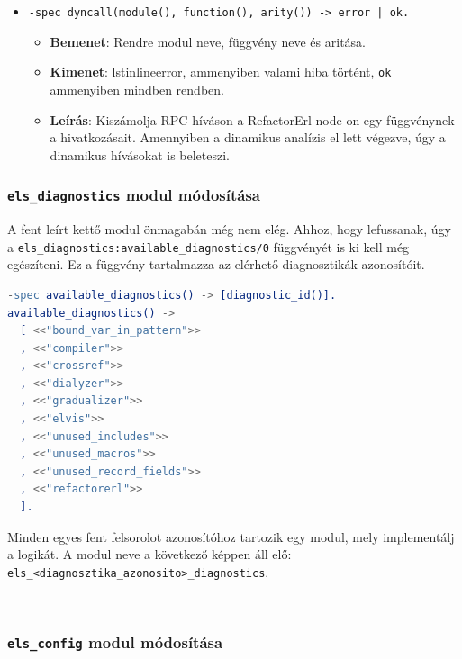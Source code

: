 \begin{itemize}
    
    
    \item \lstinline{-spec dyncall(module(), function(), arity()) -> error | ok.}
    \begin{itemize}
            \item \textbf{Bemenet}: Rendre modul neve, függvény neve és aritása.
            \item \textbf{Kimenet}:  lstinline{error}, ammenyiben valami hiba történt, \lstinline{ok} ammenyiben mindben rendben.
            \item \textbf{Leírás}: Kiszámolja RPC híváson a RefactorErl node-on egy függvénynek a hivatkozásait. Amennyiben a dinamikus analízis el lett végezve, úgy a dinamikus hívásokat is beleteszi.
        \end{itemize}

\end{itemize}




\subsubsection{\lstinline{els_diagnostics} modul módosítása}

A fent leírt kettő modul önmagabán még nem elég. Ahhoz, hogy lefussanak, úgy a \lstinline{els_diagnostics:available_diagnostics/0} függvényét is ki kell még egészíteni. Ez a függvény tartalmazza az elérhető diagnosztikák azonosítóit.

\begin{lstlisting}[language={erlang}]
-spec available_diagnostics() -> [diagnostic_id()].
available_diagnostics() ->
  [ <<"bound_var_in_pattern">>
  , <<"compiler">>
  , <<"crossref">>
  , <<"dialyzer">>
  , <<"gradualizer">>
  , <<"elvis">>
  , <<"unused_includes">>
  , <<"unused_macros">>
  , <<"unused_record_fields">>
  , <<"refactorerl">>
  ].
 \end{lstlisting}
 
Minden egyes fent felsorolot azonosítóhoz tartozik egy modul, mely implementálj a logikát. A modul neve a következő képpen áll elő: \lstinline{els_<diagnosztika_azonosito>_diagnostics}.

\\

\subsubsection{\lstinline{els_config} modul módosítása}

